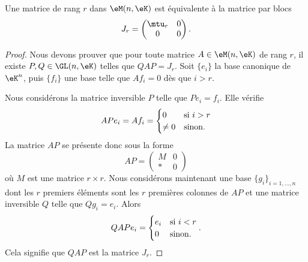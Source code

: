 \begin{lemma}   \label{LemZMxxnfM}
    Une matrice de rang \( r\) dans \( \eM(n,\eK)\) est équivalente à la matrice par blocs
    \begin{equation}
        J_r=\begin{pmatrix}
            \mtu_r    &   0    \\ 
            0    &   0    
        \end{pmatrix}.
    \end{equation}
\end{lemma}

\begin{proof}
    Nous devons prouver que pour toute matrice \( A\in\eM(n,\eK)\) de rang \( r\), il existe \( P,Q\in\GL(n,\eK)\) telles que \(QAP=J_r\). Soit \( \{ e_i \}\) la base canonique de \( \eK^n\), puis \( \{ f_i \}\) une base telle que \( Af_i=0\) dès que \( i>r\).

    Nous considérons la matrice inversible \( P\) telle que \( Pe_i=f_i\). Elle vérifie
    \begin{equation}
        APe_i=Af_i=\begin{cases}
            0    &   \text{si \( i>r\)}\\
            \neq 0    &    \text{sinon}.
        \end{cases}
    \end{equation}
    La matrice \( AP\) se présente donc sous la forme
    \begin{equation}
        AP=\begin{pmatrix}
            M    &   0    \\ 
            *    &   0    
        \end{pmatrix}
    \end{equation}
    où \( M\) est une matrice \( r\times r\). Nous considérons maintenant une base \( \{ g_i \}_{i=1,\ldots, n}\) dont les \( r\) premiers éléments sont les \( r\) premières colonnes de \( AP\) et une matrice inversible \( Q\) telle que \( Qg_i=e_i\). Alors
    \begin{equation}
        QAPe_i=\begin{cases}
            e_i    &   \text{si \( i<r\)}\\
            0    &    \text{sinon}.
        \end{cases}.
    \end{equation}
    Cela signifie que \( QAP\) est la matrice \( J_r\).
\end{proof}

